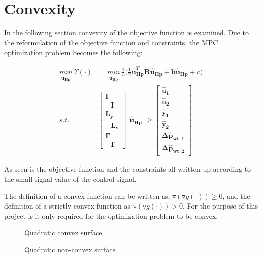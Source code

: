 \section{Convexity}
\label{convexity}
In the following section convexity of the objective function is examined. 
Due to the reformulation of the objective function and constraints, the MPC optimization problem becomes the following: 

\begin{align}
\underset{\bm{\hat{u}_{Hp}}}{min} \:  \Upsilon(\cdot) &= \underset{\bm{\hat{u}_{Hp}}}{min} \:  \frac{1}{\eta}\bigg( \frac{1}{2} \bm{\hat{u}}_{\bm{Hp}}^{T} \bm{R} \bm{\hat{u}}_{\bm{Hp}} + \bm{b} \bm{\hat{u}}_{\bm{Hp}} + c \bigg)\\
\label{eq:obj_final1}
%
s.t. \:\:\:\:\:	&\begin{bmatrix}
		\bm{I} 	\\
		-\bm{I} 	\\
		\bm{L_{y}}	\\
		-\bm{L_{y}}	\\
		\bm{\Gamma}	\\
		-\bm{\Gamma}
	\end{bmatrix}
	\begin{matrix}
			\bm{\hat{u}_{Hp}}
	\end{matrix}
	\geq 
	\begin{bmatrix}
			\bm{\hat{u}_{1}}	\\
			\bm{\hat{u}_{2}}	\\
			\bm{\hat{y}_{1}}	\\
			\bm{\hat{y}_{2}}	\\
			\bm{\Delta \hat{p}_{wt,1}}	\\
			\bm{\Delta \hat{p}_{wt,2}}	
	\end{bmatrix}
\end{align}

As seen is the objective function and the constraints all written up according to the small-signal value of the control signal. 

The definition of a convex function can be written as, $\triangledown(\triangledown g(\cdot)) \geq 0$,  and the definition of a strictly convex function as $\triangledown(\triangledown g(\cdot)) > 0$. For the purpose of this project is it only required for the optimization problem to be convex. 


\begin{figure}[H]
  \centering
  \begin{minipage}[b]{0.45\textwidth}
     
    \caption{Quadratic convex surface.}
  \end{minipage}
  \hfill
  \begin{minipage}[b]{0.45\textwidth}
     
    \caption{Quadratic non-convex surface}
  \end{minipage}
  \label{fig:nonlinearpumps}
\end{figure}

